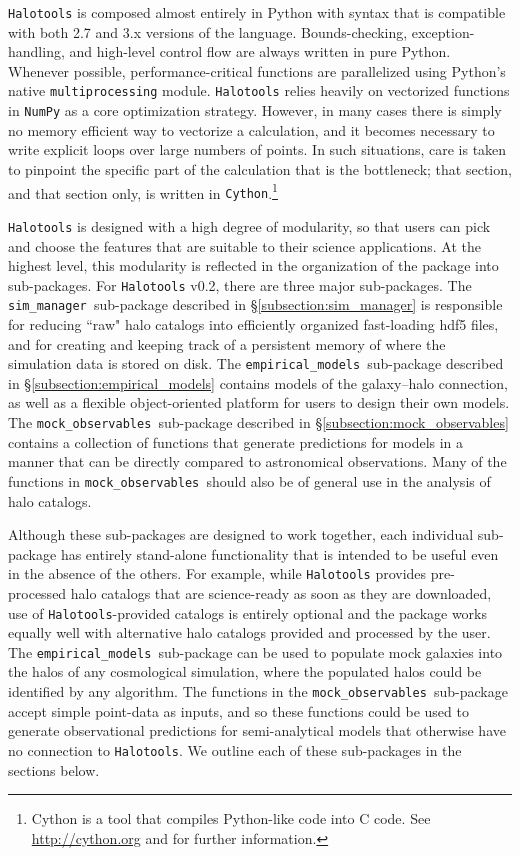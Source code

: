 \documentclass[twocolumn, tighten]{aastex6}
\newcommand{\mockobs}{{\tt mock\_observables }}
\newcommand{\emodels}{{\tt empirical\_models }}
\newcommand{\sims}{{\tt sim\_manager }}
\begin{document}
{\tt Halotools} is composed almost entirely in Python with syntax that is compatible with both 2.7 and 3.x versions of the language. Bounds-checking, exception-handling, and high-level control flow are always written in pure Python. Whenever possible, performance-critical functions are parallelized using Python's native {\tt multiprocessing} module. {\tt Halotools} relies heavily on vectorized functions in {\tt NumPy} as a core optimization strategy. However, in many cases there is simply no memory efficient way to vectorize a calculation, and it becomes necessary to write explicit loops over large numbers of points. In such situations, care is taken to pinpoint the specific part of the calculation that is the bottleneck; that section, and that section only, is written in {\tt Cython}.\footnote{Cython is a tool that compiles Python-like code into C code. See \url{http://cython.org} and \citet{cython} for further information.}

{\tt Halotools} is designed with a high degree of modularity, so that users can pick and choose the features that are suitable to their science applications. At the highest level, this modularity is reflected in the organization of the package into sub-packages. For {\tt Halotools} v0.2, there are three major sub-packages. The \sims sub-package described in \S\ref{subsection:sim_manager} is responsible for reducing ``raw" halo catalogs into efficiently organized fast-loading hdf5 files, and for creating and keeping track of a persistent memory of where the simulation data is stored on disk. The \emodels sub-package described in \S\ref{subsection:empirical_models} contains models of the galaxy--halo connection, as well as a flexible object-oriented platform for users to design their own models. The \mockobs sub-package described in \S\ref{subsection:mock_observables} contains a collection of functions that generate predictions for models in a manner that can be directly compared to astronomical observations. Many of the functions in \mockobs should also be of general use in the analysis of halo catalogs.

Although these sub-packages are designed to work together, each individual sub-package has entirely stand-alone functionality that is intended to be useful even in the absence of the others. For example, while {\tt Halotools} provides pre-processed halo catalogs that are science-ready as soon as they are downloaded, use of {\tt Halotools}-provided catalogs is entirely optional and the package works equally well with alternative halo catalogs provided and processed by the user. The \emodels sub-package can be used to populate mock galaxies into the halos of any cosmological simulation, where the populated halos could be identified by any algorithm. The functions in the \mockobs sub-package accept simple point-data as inputs, and so these functions could be used to generate observational predictions for semi-analytical models that otherwise have no connection to {\tt Halotools}. We outline each of these sub-packages in the sections below.
\end{document}
